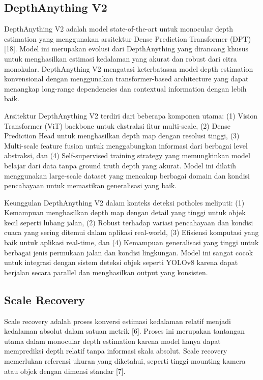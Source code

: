 \documentclass[12pt,a4paper]{report}
\begin{document}
\subsection{DepthAnything V2}

DepthAnything V2 adalah model state-of-the-art untuk monocular depth estimation yang menggunakan arsitektur Dense Prediction Transformer (DPT) [18]. Model ini merupakan evolusi dari DepthAnything yang dirancang khusus untuk menghasilkan estimasi kedalaman yang akurat dan robust dari citra monokular. DepthAnything V2 mengatasi keterbatasan model depth estimation konvensional dengan menggunakan transformer-based architecture yang dapat menangkap long-range dependencies dan contextual information dengan lebih baik.

Arsitektur DepthAnything V2 terdiri dari beberapa komponen utama: (1) Vision Transformer (ViT) backbone untuk ekstraksi fitur multi-scale, (2) Dense Prediction Head untuk menghasilkan depth map dengan resolusi tinggi, (3) Multi-scale feature fusion untuk menggabungkan informasi dari berbagai level abstraksi, dan (4) Self-supervised training strategy yang memungkinkan model belajar dari data tanpa ground truth depth yang akurat. Model ini dilatih menggunakan large-scale dataset yang mencakup berbagai domain dan kondisi pencahayaan untuk memastikan generalisasi yang baik.

Keunggulan DepthAnything V2 dalam konteks deteksi potholes meliputi: (1) Kemampuan menghasilkan depth map dengan detail yang tinggi untuk objek kecil seperti lubang jalan, (2) Robust terhadap variasi pencahayaan dan kondisi cuaca yang sering ditemui dalam aplikasi real-world, (3) Efisiensi komputasi yang baik untuk aplikasi real-time, dan (4) Kemampuan generalisasi yang tinggi untuk berbagai jenis permukaan jalan dan kondisi lingkungan. Model ini sangat cocok untuk integrasi dengan sistem deteksi objek seperti YOLOv8 karena dapat berjalan secara parallel dan menghasilkan output yang konsisten.

\subsection{Scale Recovery}

Scale recovery adalah proses konversi estimasi kedalaman relatif menjadi kedalaman absolut dalam satuan metrik [6]. Proses ini merupakan tantangan utama dalam monocular depth estimation karena model hanya dapat memprediksi depth relatif tanpa informasi skala absolut. Scale recovery memerlukan referensi ukuran yang diketahui, seperti tinggi mounting kamera atau objek dengan dimensi standar [7].
\end{document}
